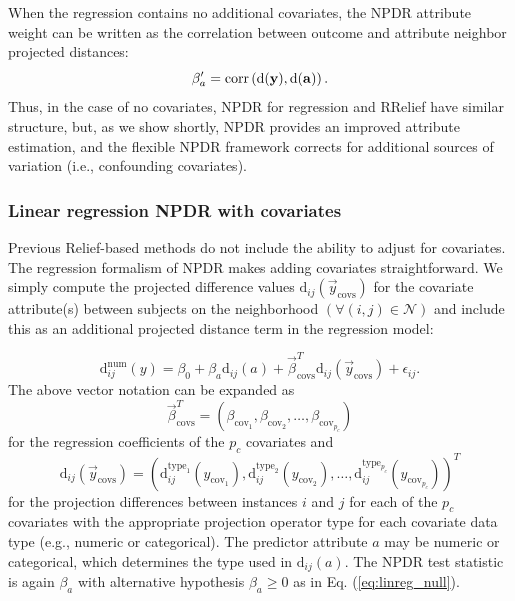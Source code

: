 \documentclass[10pt]{article}
\begin{document}
When the regression contains no additional covariates, the NPDR attribute weight can be written as the correlation between outcome and attribute neighbor projected distances:
\begin{equation}
\beta'_a = \text{corr}\left( \bf{\text{d}}(\bf{y}), \bf{\text{d}}(\bf{a}) \right).
\end{equation}
Thus, in the case of no covariates, NPDR for regression and RRelief have similar structure, but, as we show shortly, NPDR provides an improved attribute estimation, and the flexible NPDR framework corrects for additional sources of variation (i.e., confounding covariates).


\subsubsection{Linear regression NPDR with covariates}
Previous Relief-based methods do not include the ability to adjust for covariates.
The regression formalism of NPDR makes adding covariates straightforward.
We simply compute the projected difference values $\text{d}_{ij}(\vec{y}_{\text{covs}})$ for the covariate attribute(s) between subjects on the neighborhood $(\forall(i,j) \in \mathcal{N})$ and include this as an additional projected distance term in the regression model:

\begin{equation}\label{eq:lin_reg_cov}
    \text{d}^{\text{num}}_{ij}(y) = \beta_{0} + \beta_{a} \text{d}_{ij}(a) + \vec{\beta}^{T}_{\text{covs}}\text{d}_{ij}(\vec{y}_{\text{covs}}) + \epsilon_{ij}.
\end{equation}
The above vector notation can be expanded as  
\begin{equation}
\vec{\beta}^{T}_{\text{covs}} = \left( \beta_{\text{cov}_1}, \beta_{\text{cov}_2}, \ldots,  \beta_{\text{cov}_{p_c}} \right)
\end{equation}
for the regression coefficients of the $p_c$ covariates and 
\begin{equation}
\text{d}_{ij}(\vec{y}_\text{covs})= \left( \text{d}^{\text{type}_1}_{ij}({y}_{\text{cov}_1}), \text{d}^{\text{type}_2}_{ij}({y}_{\text{cov}_2}), \ldots, \text{d}^{\text{type}_{p_c}}_{ij}({y}_{\text{cov}_{p_c}}) \right)^{T}
\end{equation}
for the projection differences between instances $i$ and $j$ for each of the $p_c$ covariates with the appropriate projection operator type for each covariate data type (e.g., numeric or categorical).
The predictor attribute $a$ may be numeric or categorical, which determines the type used in $\text{d}_{ij}(a)$.
The NPDR test statistic is again $\beta_a$ with alternative hypothesis $\beta_a \ge 0$ as in Eq. (\ref{eq:linreg_null}).
\end{document}
